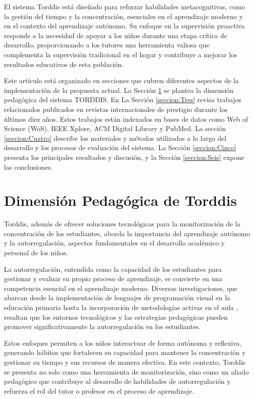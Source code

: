 \documentclass[a4paper,fleqn]{cas-sc}
\begin{document}
	El sistema Torddis está diseñado para reforzar habilidades metacognitivas, como la gestión del tiempo y la concentración, esenciales en el aprendizaje moderno y en el contexto del aprendizaje autónomo. Su enfoque en la supervisión proactiva responde a la necesidad de apoyar a los niños durante una etapa crítica de desarrollo, proporcionando a los tutores una herramienta valiosa que complementa la supervisión tradicional en el hogar y contribuye a mejorar los resultados educativos de esta población.
	
	Este artículo está organizado en secciones que cubren diferentes aspectos de la implementación de la propuesta actual. La Sección \ref{seccion:Dos} se plantea la dimensión pedagógica del sistema TORDDIS. En La Sección \ref{seccion:Tres} revisa trabajos relacionados publicados en revistas internacionales de prestigio durante los últimos diez años. Estos trabajos están indexados en bases de datos como Web of Science (WoS), IEEE Xplore, ACM Digital Library y PubMed. La sección \ref{seccion:Cuatro} describe los materiales y métodos utilizados a lo largo del desarrollo y los procesos de evaluación del sistema. La Sección \ref{seccion:Cinco} presenta los principales resultados y discusión, y la Sección \ref{seccion:Seis} expone las conclusiones.
	
	\section{Dimensión Pedagógica de Torddis}
	\label{seccion:Dos}	
	Torddis, además de ofrecer soluciones tecnológicas para la monitorización de la concentración de los estudiantes, aborda la importancia del aprendizaje autónomo y la autorregulación, aspectos fundamentales en el desarrollo académico y personal de los niños.
	
	La autorregulación, entendida como la capacidad de los estudiantes para gestionar y evaluar su propio proceso de aprendizaje, se convierte en una competencia esencial en el aprendizaje moderno. Diversas investigaciones, que abarcan desde la implementación de lenguajes de programación visual en la educación primaria \citep{SaezLopez2016Visual} hasta la incorporación de metodologías activas en el aula \citep{Mohamed2018Implementing}, resaltan que los entornos tecnológicos y las estrategias pedagógicas pueden promover significativamente la autorregulación en los estudiantes.
	
	Estos enfoques permiten a los niños interactuar de forma autónoma y reflexiva, generando hábitos que fortalecen su capacidad para mantener la concentración y gestionar su tiempo y sus recursos de manera efectiva. En este contexto, Torddis se presenta no solo como una herramienta de monitorización, sino como un aliado pedagógico que contribuye al desarrollo de habilidades de autorregulación y refuerza el rol del tutor o profesor en el proceso de aprendizaje.
	
\end{document}
